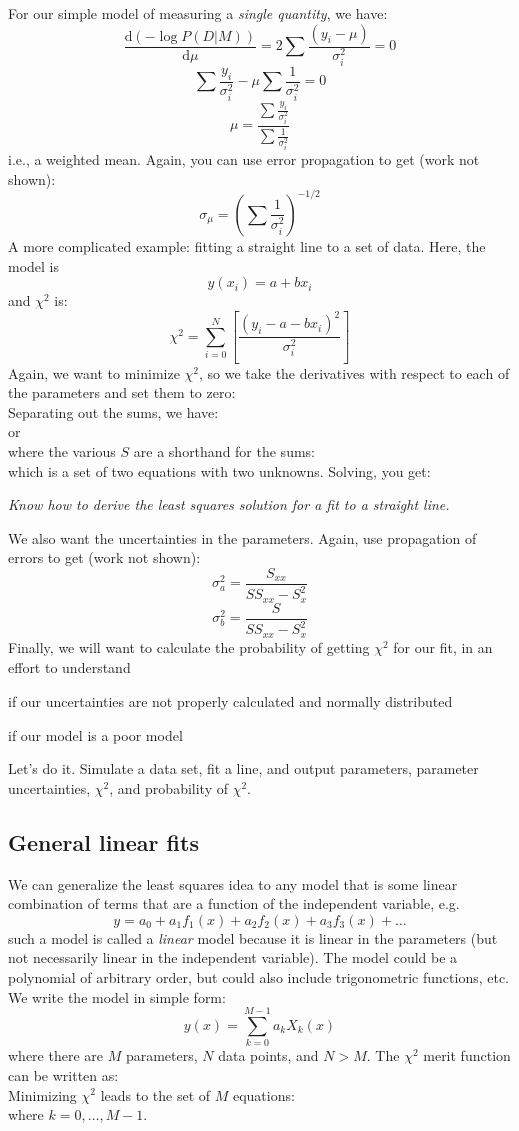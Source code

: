 \documentclass[12pt]{article}
\begin{document}
For our simple model of measuring a \emph{single quantity}, we have:
$$ \frac{\mathrm{d}(-\log P(D|M))}{\mathrm{d}\mu} =
2\sum\frac{(y_{i}-\mu)}{\sigma_i^2} = 0 $$
$$ \sum\frac{y_i}{\sigma_i^2} - \mu\sum\frac{1}{\sigma_i^2} = 0 $$
$$ \mu = \frac{\sum\frac{y_i}{\sigma_i^2}}{\sum\frac{1}{\sigma_i^2}}$$
i.e., a weighted mean. Again, you can use error
propagation to get (work not shown):
$$ \sigma_{\mu} = \left(\sum\frac{1}{\sigma_i^2}\right)^{-1/2}  $$
A more complicated example: fitting a straight line to a set of data.
Here, the model is
$$ y(x_i) = a + bx_i $$
and $\chi^2$ is:
$$ \chi^2 = \sum_{i=0}^{N}\left[\frac{(y_i-a-bx_i)^2}{\sigma_i^2}\right]  $$
Again, we want to minimize $\chi^2$, so we take the derivatives with respect
to each of the parameters and set them to zero:
$$ $$
$$ $$
Separating out the sums, we have:
$$ $$
$$ $$
or
$$ $$
$$ $$
where the various $S$ are a shorthand for the sums:
$$ $$
$$ $$
$$ $$
$$ $$
$$ $$
which is a set of two equations with two unknowns. Solving, you get:
$$ $$
$$ $$

\colorbox{hl}{\parbox{0.9\textwidth}
{\emph{Know how to derive the least squares solution for a fit to a straight line.}}}

We also want the uncertainties in the parameters.
Again, use propagation of errors to get (work not shown):
$$ \sigma_a^2 = \frac{S_{xx}}{SS_{xx}-S_x^2}   $$
$$ \sigma_b^2 = \frac{S}{SS_{xx}-S_x^2}   $$
Finally, we will want to calculate the probability of getting
$ \chi^{2}_{}$ for our fit,
in an effort to understand
\begin{enumerate*}
    \item if our uncertainties are not properly calculated and normally distributed
    \item if our model is a poor model
\end{enumerate*}

Let's do it. Simulate a data set, fit a line, and output parameters, parameter
uncertainties, $\chi^2$, and probability of $\chi^2$.


\subsection{General linear fits}
We can generalize the least squares idea to any model that is some linear
combination of terms that are a function of the independent variable,
e.g.
$$ y = a_0 + a_1f_1(x) + a_2f_2(x) + a_3f_3(x) + \ldots $$
such a model is called a \emph{linear} model because it is linear
in the parameters (but not necessarily linear in the independent
variable). The model could be a polynomial of arbitrary order, but
could also include trigonometric functions, etc. We write the model
in simple form:
$$ y(x) = \sum_{k=0}^{M-1}a_kX_k(x) $$
where there are $M$ parameters, $N$ data points, and $N>M$.
The $\chi^2$ merit function can be written as:
$$ $$
Minimizing $\chi^2$ leads to the set of $M$ equations:
$$ $$
where $k=0,\ldots,M-1$.
\end{document}
